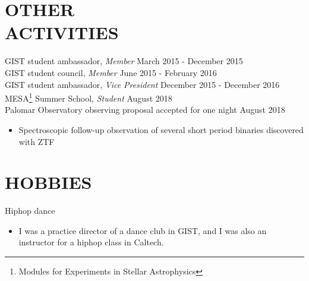 \documentclass[margin, 10pt]{res} %
\begin{document}
\begin{resume}

\section{OTHER \\ ACTIVITIES} 

GIST student ambassador, {\sl Member} \hfill March 2015 - December 2015\\
GIST student council, {\sl Member} \hfill June 2015 - February 2016\\
GIST student ambassador, {\sl Vice President} \hfill December 2015 - December 2016 \\
MESA\footnote{Modules for Experiments in Stellar Astrophysics} Summer School, {\sl Student} \hfill August 2018 \\
Palomar Observatory observing proposal accepted for one night \hfill August 2018
\begin{itemize}
\item[] Spectroscopic follow-up observation of several short period binaries discovered with ZTF
\end{itemize}


\section{HOBBIES} 

Hiphop dance
\begin{itemize}
\item[] I was a practice director of a dance club in GIST, and I was also an instructor for a hiphop class in Caltech.
\end{itemize}



\end{resume}
\end{document}
